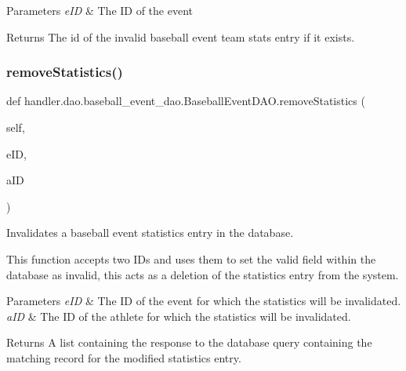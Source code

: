 \begin{DoxyParams}{Parameters}
{\em e\+ID} & The ID of the event\\
\hline
\end{DoxyParams}
\begin{DoxyReturn}{Returns}
The id of the invalid baseball event team stats entry if it exists. 
\end{DoxyReturn}
\mbox{\label{classhandler_1_1dao_1_1baseball__event__dao_1_1_baseball_event_d_a_o_ac60fa40a9fe92a1d3d41dbbaeae116dc}} 
\subsubsection{\texorpdfstring{remove\+Statistics()}{removeStatistics()}}
{\footnotesize\ttfamily def handler.\+dao.\+baseball\+\_\+event\+\_\+dao.\+Baseball\+Event\+D\+A\+O.\+remove\+Statistics (\begin{DoxyParamCaption}\item[{}]{self,  }\item[{}]{e\+ID,  }\item[{}]{a\+ID }\end{DoxyParamCaption})}



Invalidates a baseball event statistics entry in the database. 

This function accepts two I\+Ds and uses them to set the valid field within the database as invalid, this acts as a deletion of the statistics entry from the system.


\begin{DoxyParams}{Parameters}
{\em e\+ID} & The ID of the event for which the statistics will be invalidated. \\
\hline
{\em a\+ID} & The ID of the athlete for which the statistics will be invalidated.\\
\hline
\end{DoxyParams}
\begin{DoxyReturn}{Returns}
A list containing the response to the database query containing the matching record for the modified statistics entry. 
\end{DoxyReturn}
\mbox{\label{classhandler_1_1dao_1_1baseball__event__dao_1_1_baseball_event_d_a_o_a478d1bc34edaec4f1d95218eb8484cee}} 
